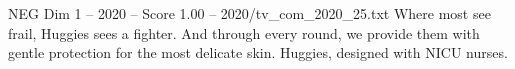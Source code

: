\begin{textsample}{NEG Dim 1 – 2020 – Score 1.00 – 2020/tv\_com\_2020\_25.txt}  \label{ex:f1_neg_020}
Where most see frail, Huggies sees a fighter.
And through every round, we provide them with gentle protection for the most delicate skin.
Huggies, designed with NICU nurses.

\end{textsample}
